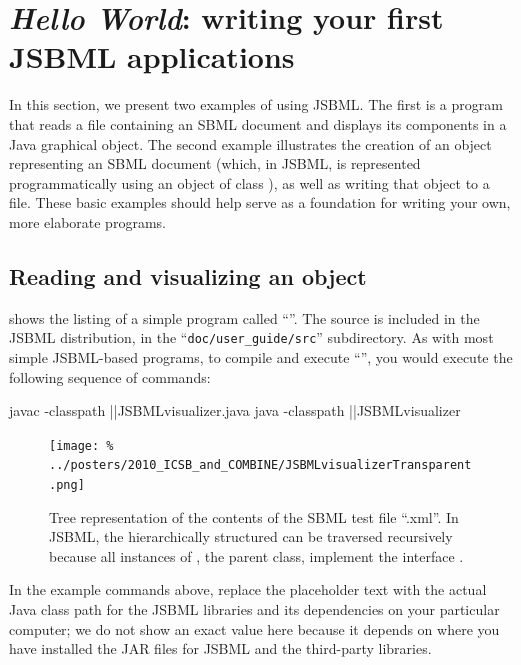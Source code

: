 
\section[Writing your first JSBML application]{\emph{Hello World}: writing your first JSBML applications}
\label{sec:hello-world}

In this section, we present two examples of using JSBML. The first is a
program that reads a file containing an SBML document and displays its
components in a Java \JTree graphical object. The second example
illustrates the creation of an object representing an SBML document (which,
in JSBML, is represented programmatically using an object of class
\SBMLDocument), as well as writing that object to a file. These basic
examples should help serve as a foundation for writing your own, more
elaborate programs.


\subsection{Reading and visualizing an  object}

 shows the listing of a simple program
called ``''.  The source is included in the JSBML
distribution, in the ``\texttt{doc/user\_guide/src}'' subdirectory.  As
with most simple JSBML-based programs, to compile and execute
``'', you would execute the following sequence of
commands:

\newcommand{\classpath}{\code{\emph{\color{winered}classpath}}\xspace}

\begin{example}[style=bash, title={Compiling and executing the example program.}]
  javac -classpath |\classpath|JSBMLvisualizer.java
  java -classpath |\classpath|JSBMLvisualizer
\end{example}

\begin{figure}
  \centering
  \vspace*{-1.8em}
  \setlength{\captionmargin}{1.8em}
  \texttt{[image: \%
    ../posters/2010\_ICSB\_and\_COMBINE/JSBMLvisualizerTransparent.png]}
  \caption[Tree representation of an SBML file]{Tree representation of
    the contents of the SBML test file ``.xml''. In JSBML,
    the hierarchically structured \SBMLDocument can be traversed
    recursively because all instances of \SBase, the parent class,
    implement the interface \TreeNode.}
  \label{fig:JSBMLvisualizer-output}
\end{figure}
In the example commands above, replace the placeholder text \classpath with
the actual Java class path for the JSBML libraries and its dependencies on
your particular computer; we do not show an exact value here because it
depends on where you have installed the JAR files for JSBML and the
third-party libraries.

